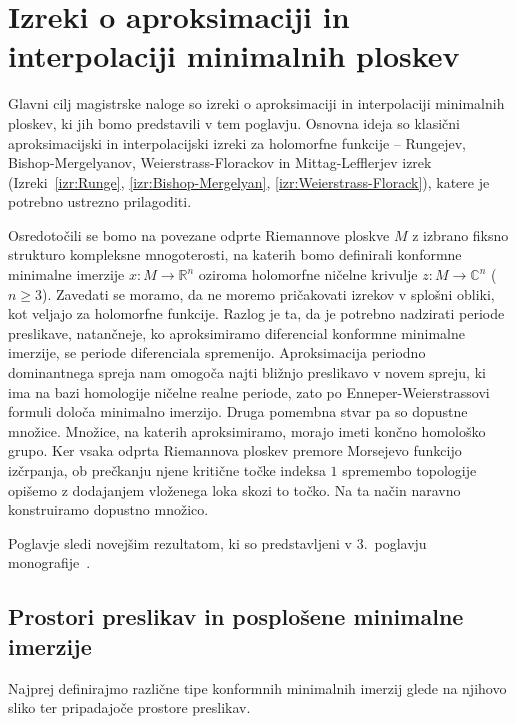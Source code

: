 \documentclass[12pt,a4paper,twoside]{article}
\theoremstyle{definition} %
\theoremstyle{plain} %
\numberwithin{equation}{section}  %
\begin{document}
\clearpage
\section{Izreki o aproksimaciji in interpolaciji minimalnih ploskev}

Glavni cilj magistrske naloge so izreki o aproksimaciji in interpolaciji minimalnih ploskev, ki jih bomo predstavili v tem poglavju. Osnovna ideja so klasični aproksimacijski in interpolacijski izreki za holomorfne funkcije -- Rungejev, Bishop-Mergelyanov, Weierstrass-Florackov in Mittag-Lefflerjev izrek (Izreki~\ref{izr:Runge}, \ref{izr:Bishop-Mergelyan}, \ref{izr:Weierstrass-Florack}), katere je potrebno ustrezno prilagoditi.

Osredotočili se bomo na povezane odprte Riemannove ploskve $M$ z izbrano fiksno strukturo kompleksne mnogoterosti, na katerih bomo definirali konformne minimalne imerzije $x \colon M \to \mathbb{R}^{n}$ oziroma holomorfne ničelne krivulje $z \colon M \to \mathbb{C}^{n}$ ($n \geq 3$).
Zavedati se moramo, da ne moremo pričakovati izrekov v splošni obliki, kot veljajo za holomorfne funkcije. Razlog je ta, da je potrebno nadzirati periode preslikave, natančneje, ko aproksimiramo diferencial konformne minimalne imerzije, se periode diferenciala spremenijo. Aproksimacija periodno dominantnega spreja nam omogoča najti bližnjo preslikavo v novem spreju, ki ima na bazi homologije ničelne realne periode, zato po Enneper-Weierstrassovi formuli določa minimalno imerzijo.
Druga pomembna stvar pa so dopustne množice. Množice, na katerih aproksimiramo, morajo imeti končno homološko grupo. Ker vsaka odprta Riemannova ploskev premore Morsejevo funkcijo izčrpanja, ob prečkanju njene kritične točke indeksa $1$ spremembo topologije opišemo z dodajanjem vloženega loka skozi to točko. Na ta način naravno konstruiramo dopustno množico.

Poglavje sledi novejšim rezultatom, ki so predstavljeni v 3.~poglavju monografije~\cite{alarcon2021minimal}.

\subsection{Prostori preslikav in posplošene minimalne imerzije}
%
Najprej definirajmo različne tipe konformnih minimalnih imerzij glede na njihovo sliko ter pripadajoče prostore preslikav.
\end{document}
